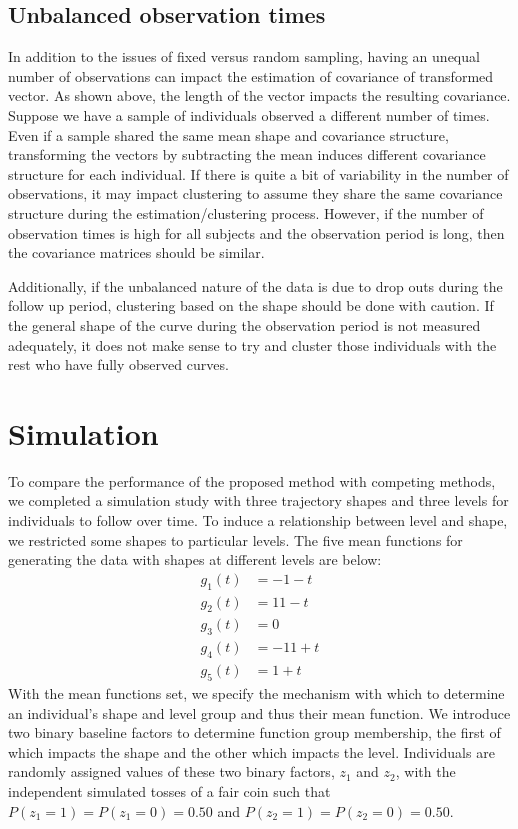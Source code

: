 \documentclass[12pt]{article}
\begin{document}
\subsection{Unbalanced observation times}
In addition to the issues of fixed versus random sampling, having an unequal number of observations can impact the estimation of covariance of transformed vector. As shown above, the length of the vector impacts the resulting covariance. Suppose we have a sample of individuals observed a different number of times. Even if a sample shared the same mean shape and covariance structure, transforming the vectors by subtracting the mean induces different covariance structure for each individual. If there is quite a bit of variability in the number of observations, it may impact clustering to assume they share the same covariance structure during the estimation/clustering process. However, if the number of observation times is high for all subjects and the observation period is long, then the covariance matrices should be similar. 

Additionally, if the unbalanced nature of the data is due to drop outs during the follow up period, clustering based on the shape should be done with caution. If the general shape of the curve during the observation period is not measured adequately, it does not make sense to try and cluster those individuals with the rest who have fully observed curves. 

\section{Simulation}
To compare the performance of the proposed method with competing methods, we completed a simulation study with three trajectory shapes and three levels for individuals to follow over time. To induce a relationship between level and shape, we restricted some shapes to particular levels. The five mean functions for generating the data with shapes at different levels are below:   \begin{align*}
g_{1}(t) &= -1 - t\\
g_{2}(t) &= 11 - t\\
g_{3}(t) &= 0\\
g_{4}(t) &= -11 + t\\
g_{5}(t) &= 1 + t
\end{align*} 
With the mean functions set, we specify the mechanism with which to determine an individual's shape and level group and thus their mean function. We introduce two binary baseline factors to determine function group membership, the first of which impacts the shape and the other which impacts the level. Individuals are randomly assigned values of these two binary factors, $z_{1}$ and $z_{2}$, with the independent simulated tosses of a fair coin such that $P(z_{1}=1) = P(z_{1}=0) = 0.50$ and $P(z_{2}=1) = P(z_{2}=0)=0.50$. 
\end{document}
